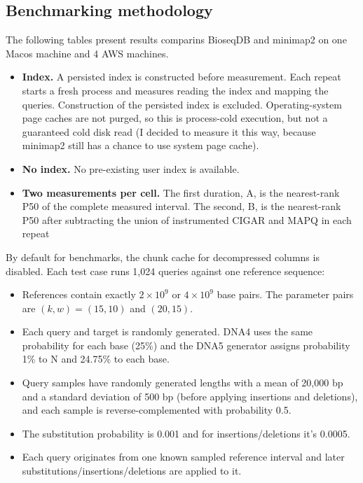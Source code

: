 \subsection{Benchmarking methodology}
\label{sec:benchmark-results}

The following tables present results comparins BioseqDB and minimap2 on one Macos machine and 4 AWS machines.

\begin{itemize}
  \item \textbf{Index.} A persisted index is constructed before measurement.
  Each repeat starts a fresh process and measures reading the index and mapping
  the queries. Construction of the persisted index is excluded. Operating-system page caches are not purged, so
  this is process-cold execution, but not a guaranteed cold disk read (I decided to measure it this way, because minimap2 still has a chance to use system page cache).
  \item \textbf{No index.} No pre-existing user index is available.
  \item \textbf{Two measurements per cell.} The first duration, A, is the
  nearest-rank P50 of the complete measured interval. The second, B, is the
  nearest-rank P50 after subtracting the union of instrumented CIGAR
  and MAPQ in each repeat
\end{itemize}

By default for benchmarks, the chunk cache for decompressed columns is disabled.
Each test case runs 1,024 queries against one reference sequence:
\begin{itemize}
  \item References contain exactly
  $2\times10^9$ or $4\times10^9$ base pairs.
  The parameter pairs are $(k,w)=(15,10)$ and $(20,15)$.
  \item Each query and target is randomly generated. DNA4 uses the same probability for each base (25\%) and the DNA5
  generator assigns probability 1\% to N and 24.75\% to each base.
  \item Query samples have randomly generated lengths with a mean of 20,000 bp and a standard deviation of 500 bp (before applying insertions and deletions), and each sample is reverse-complemented with probability 0.5.
  \item The substitution probability is 0.001 and for insertions/deletions it's 0.0005.
  \item Each query originates from one known sampled
  reference interval and later substitutions/insertions/deletions are applied to it.
\end{itemize}

